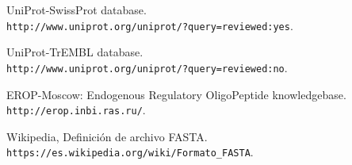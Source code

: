 \documentclass[letterpaper, 10pt, notitlepage]{report}
\newlength{\defbaselineskip}
\newcommand{\singlespacing}{\setlength{\baselineskip}{\defbaselineskip}}
\begin{document}
\begin{thebibliography}{9}
UniProt-SwissProt database.
\\\texttt{http://www.uniprot.org/uniprot/?query=reviewed:yes}.

UniProt-TrEMBL database.
\\\texttt{http://www.uniprot.org/uniprot/?query=reviewed:no}.

EROP-Moscow: Endogenous Regulatory OligoPeptide knowledgebase.
\\\texttt{http://erop.inbi.ras.ru/}.

Wikipedia, Definición de archivo FASTA.
\\\texttt{https://es.wikipedia.org/wiki/Formato\_FASTA}.


\end{thebibliography}

%




\singlespacing
\cleardoublepage
\end{document}
